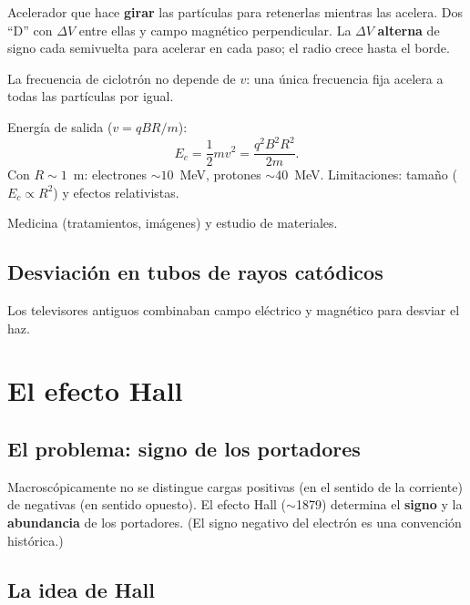\documentclass[12pt,a4paper]{article}
\begin{document}
Acelerador que hace \textbf{girar} las partículas para retenerlas
mientras las acelera. Dos \enquote{D} con $\Delta V$ entre ellas y campo
magnético perpendicular. La $\Delta V$ \textbf{alterna} de signo cada
semivuelta para acelerar en cada paso; el radio crece hasta el borde.

\begin{keybox}[La clave]
  La frecuencia de ciclotrón no depende de $v$: una única frecuencia fija
  acelera a todas las partículas por igual.
\end{keybox}

Energía de salida ($v = qBR/m$):
\[
\boxed{E_c = \frac{1}{2}m v^2 = \frac{q^2 B^2 R^2}{2m}}.
\]
Con $R\sim 1$~m: electrones $\sim 10$~MeV, protones $\sim 40$~MeV.
Limitaciones: tamaño ($E_c\propto R^2$) y efectos relativistas.

\begin{notebox}
  Medicina (tratamientos, imágenes) y estudio de materiales.
\end{notebox}

\subsection{Desviación en tubos de rayos catódicos}

Los televisores antiguos combinaban campo eléctrico y magnético para
desviar el haz.

\section{El efecto Hall}

\subsection{El problema: signo de los portadores}

Macroscópicamente no se distingue cargas positivas (en el sentido de la
corriente) de negativas (en sentido opuesto). El efecto Hall
($\sim$1879) determina el \textbf{signo} y la \textbf{abundancia} de los
portadores. (El signo negativo del electrón es una convención histórica.)

\subsection{La idea de Hall}
\end{document}
